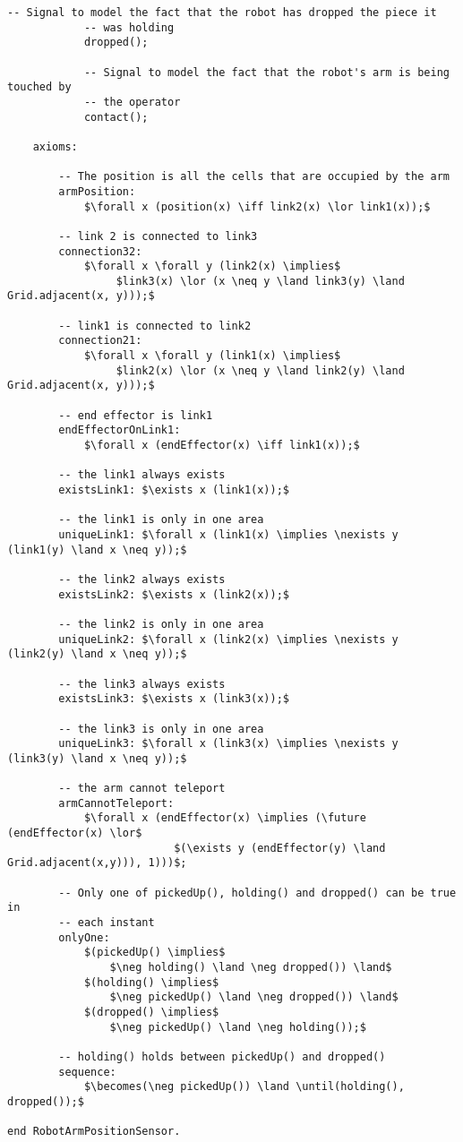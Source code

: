 \begin{lstlisting}[fontadjust, mathescape, frame=single]
            -- Signal to model the fact that the robot has dropped the piece it
            -- was holding
            dropped();

            -- Signal to model the fact that the robot's arm is being touched by
            -- the operator
            contact();

    axioms:

        -- The position is all the cells that are occupied by the arm
        armPosition: 
            $\forall x (position(x) \iff link2(x) \lor link1(x));$
        
        -- link 2 is connected to link3
        connection32: 
            $\forall x \forall y (link2(x) \implies$
                 $link3(x) \lor (x \neq y \land link3(y) \land Grid.adjacent(x, y)));$

        -- link1 is connected to link2
        connection21: 
            $\forall x \forall y (link1(x) \implies$ 
                 $link2(x) \lor (x \neq y \land link2(y) \land Grid.adjacent(x, y)));$

        -- end effector is link1
        endEffectorOnLink1:
            $\forall x (endEffector(x) \iff link1(x));$

        -- the link1 always exists
        existsLink1: $\exists x (link1(x));$

        -- the link1 is only in one area
        uniqueLink1: $\forall x (link1(x) \implies \nexists y (link1(y) \land x \neq y));$
        
        -- the link2 always exists
        existsLink2: $\exists x (link2(x));$

        -- the link2 is only in one area
        uniqueLink2: $\forall x (link2(x) \implies \nexists y (link2(y) \land x \neq y));$

        -- the link3 always exists
        existsLink3: $\exists x (link3(x));$

        -- the link3 is only in one area
        uniqueLink3: $\forall x (link3(x) \implies \nexists y (link3(y) \land x \neq y));$    

        -- the arm cannot teleport
        armCannotTeleport:
            $\forall x (endEffector(x) \implies (\future (endEffector(x) \lor$
                          $(\exists y (endEffector(y) \land Grid.adjacent(x,y))), 1)))$;

        -- Only one of pickedUp(), holding() and dropped() can be true in 
        -- each instant
        onlyOne:
            $(pickedUp() \implies$
                $\neg holding() \land \neg dropped()) \land$
            $(holding() \implies$ 
                $\neg pickedUp() \land \neg dropped()) \land$
            $(dropped() \implies$
                $\neg pickedUp() \land \neg holding());$

        -- holding() holds between pickedUp() and dropped()
        sequence:
            $\becomes(\neg pickedUp()) \land \until(holding(), dropped());$

end RobotArmPositionSensor.
\end{lstlisting}
